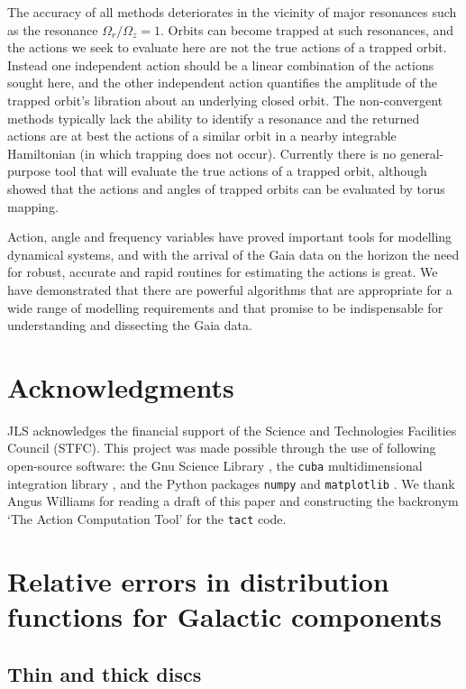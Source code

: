 \documentclass[useAMS,usenatbib,fleqn,a4paper]{mn2e}
\begin{document}
The accuracy of all methods deteriorates in the vicinity of major resonances
such as the resonance $\Omega_r/\Omega_z=1$. Orbits can become trapped at
such resonances, and the actions we seek to evaluate here are not the true
actions of a trapped orbit. Instead one independent action should be a linear
combination of the actions sought here, and the other independent action
quantifies the amplitude of the trapped orbit's libration about an underlying
closed orbit.  The non-convergent methods typically lack the ability to
identify a resonance and the returned actions are at best the actions of a
similar orbit in a nearby integrable Hamiltonian (in which trapping does not
occur). Currently there is no general-purpose tool that will evaluate the
true actions of a trapped orbit, although \cite{KaasalainenB} showed that the
actions and angles of trapped orbits can be evaluated by torus mapping.

Action, angle and frequency variables have proved important tools for modelling dynamical systems, and with the arrival of the Gaia data on the horizon the need for robust, accurate and rapid routines for estimating the actions is great. We have demonstrated that there are powerful algorithms that are appropriate for a wide range of modelling requirements and that promise to be indispensable for understanding and dissecting the Gaia data.

\section*{Acknowledgments}
JLS acknowledges the financial support of the Science and Technologies Facilities Council (STFC). This project was made possible through the use of following open-source software: the Gnu Science Library \citep[GSL]{GSL}, the \texttt{cuba} multidimensional integration library \citep{cuba}, and the Python packages \texttt{numpy} \citep{numpy} and \texttt{matplotlib} \citep{matplotlib}. We thank Angus Williams for reading a draft of this paper and constructing the backronym `The Action Computation Tool' for the \texttt{tact} code.




\appendix
\section{Relative errors in distribution functions for Galactic components}\label{Appendix}
\subsection{Thin and thick discs}
\end{document}
